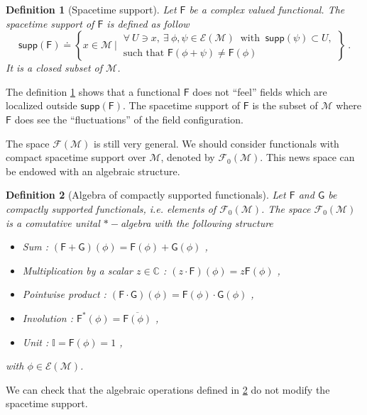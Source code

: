 \documentclass[12pt]{book}
\newcommand{\supp}{\mathsf{supp}}
\newcommand{\Ecal}{\mathcal{E}}
\newcommand{\Fcal}{\mathcal{F}}
\newcommand{\Mcal}{\mathcal{M}}
\newcommand{\Cbb}{\mathbb{C}}
\newcommand{\Ibb}{\mathbb{I}}
\newcommand{\Fsf}{\mathsf{F}}
\newcommand{\Gsf}{\mathsf{G}}
\theoremstyle{break}
\newtheorem{definition}{Definition}
\begin{document}
\begin{definition}[Spacetime support] \label{def:spacetime_supp}
Let $\Fsf$ be a complex valued functional. The spacetime support of $\Fsf$ is defined as follow
%
\begin{equation*}
\supp(\Fsf) \doteq \left\{ x \in \Mcal \ \bigg| \ 
\begin{array}{l}
\forall \ U \ni x , \ \exists \ \phi, \psi \in \Ecal(\Mcal) \ \mbox{ with } \ \supp(\psi) \subset U, \\
\mbox{such that } \Fsf(\phi + \psi) \neq \Fsf(\phi)
\end{array}
\right\} \ .
\end{equation*}
It is a closed subset of $\Mcal$.
%
\end{definition}


The definition \ref{def:spacetime_supp} shows that a functional $\Fsf$ does not ``feel'' fields which are localized outside $\supp(\Fsf)$. The spacetime support of $\Fsf$ is the subset of $\Mcal$ where $\Fsf$ does see the ``fluctuations'' of the field configuration.




The space $\Fcal(\Mcal)$ is still very general. We should consider functionals with compact spacetime support over $\Mcal$, denoted by $\Fcal_0(\Mcal)$. This news space can be endowed with an algebraic structure. 


\begin{definition}[Algebra of compactly supported functionals] \label{def:algebra_comp_supp_func}
Let $\Fsf$ and $\Gsf$ be compactly supported functionals, i.e. elements of $\Fcal_0(\Mcal)$. The space $\Fcal_0(\Mcal)$ is a comutative unital $\ast-$algebra with the following structure
%
\begin{itemize}
\item Sum : $(\Fsf+\Gsf)(\phi) = \Fsf(\phi) + \Gsf(\phi)$ ,
\item Multiplication by a scalar $z\in\Cbb$ : $(z \cdot \Fsf)(\phi) = z \Fsf(\phi)$ ,
\item Pointwise product : $(\Fsf \cdot \Gsf)(\phi) = \Fsf(\phi) \cdot \Gsf(\phi)$ ,
\item Involution : $\Fsf^\ast(\phi) = \overline{\Fsf(\phi)}$ ,
\item Unit : $\Ibb = \Fsf(\phi) = 1$ ,
\end{itemize}
%
with $\phi \in \Ecal(\Mcal)$.
\end{definition}


We can check that the algebraic operations defined in \ref{def:algebra_comp_supp_func} do not modify the spacetime support.
\end{document}
